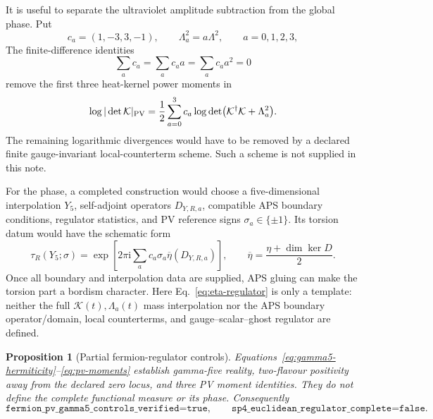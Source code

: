 \documentclass[11pt]{article}
\newtheorem{proposition}[theorem]{Proposition}
\theoremstyle{definition}
\theoremstyle{remark}
\newcommand{\ii}{\mathrm i}
\begin{document}
It is useful to separate the ultraviolet amplitude subtraction from the
global phase.  Put
\begin{equation}
 c_a=(1,-3,3,-1),\qquad
 \Lambda_a^2=a\Lambda^2,\qquad a=0,1,2,3,
 \label{eq:pv-data}
\end{equation}
The finite-difference identities
\begin{equation}
 \sum_ac_a=\sum_ac_aa=\sum_ac_aa^2=0
 \label{eq:pv-moments}
\end{equation}
remove the first three heat-kernel power moments in
\begin{equation}
 \log|\det\mathcal K|_{\rm PV}
 =\frac12\sum_{a=0}^3c_a
   \log\det\bigl(\mathcal K^\dagger\mathcal K+\Lambda_a^2\bigr).
 \label{eq:pv-amplitude}
\end{equation}
The remaining logarithmic divergences would have to be removed by a
declared finite gauge-invariant local-counterterm scheme.  Such a scheme is
not supplied in this note.

For the phase, a completed construction would choose a five-dimensional
interpolation \(Y_5\), self-adjoint operators \(D_{Y,R,a}\), compatible APS
boundary conditions, regulator statistics, and PV reference signs
\(\sigma_a\in\{\pm1\}\).  Its torsion datum would have the schematic form
\begin{equation}
 \tau_R(Y_5;\sigma)
 =\exp\!\left[2\pi\ii\sum_ac_a\sigma_a
 \overline\eta(D_{Y,R,a})\right],
 \qquad
 \overline\eta=\frac{\eta+\dim\ker D}{2}.
 \label{eq:eta-regulator}
\end{equation}
Once all boundary and interpolation data are supplied, APS gluing can make
the torsion part a bordism character.  Here
Eq.~\eqref{eq:eta-regulator} is only a template: neither the full
\(\mathcal K(t),\Lambda_a(t)\) mass interpolation nor the APS boundary
operator/domain, local counterterms, and gauge--scalar--ghost regulator are
defined.

\begin{proposition}[Partial fermion-regulator controls]
Equations~\eqref{eq:gamma5-hermiticity}--\eqref{eq:pv-moments} establish
gamma-five reality, two-flavour positivity away from the declared zero
locus, and three PV moment identities.  They do not define the complete
functional measure or its phase.  Consequently
\begin{equation}
 \texttt{fermion\_pv\_gamma5\_controls\_verified=true},\qquad
 \texttt{sp4\_euclidean\_regulator\_complete=false}.
 \label{eq:regulator-partial-gate}
\end{equation}
\end{proposition}
\end{document}
